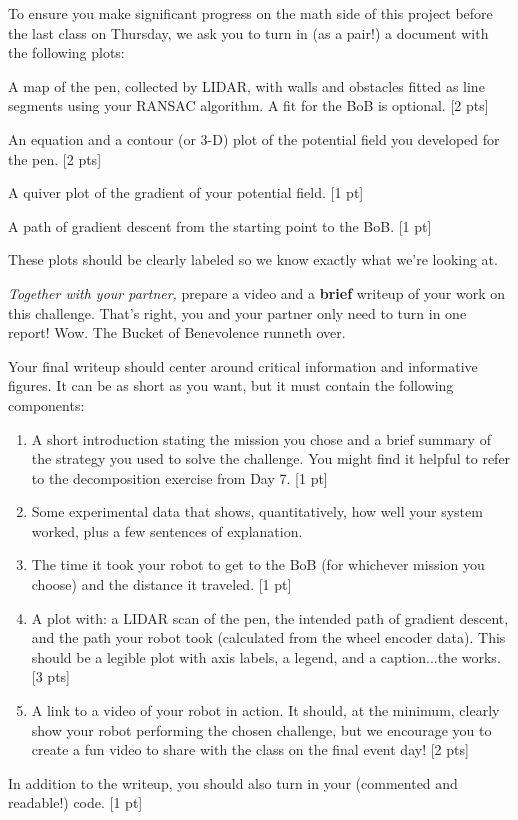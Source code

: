 \documentclass{tufte-handout}
\begin{document}
To ensure you make significant progress on the math side of this project before the last class on Thursday, we ask you to turn in (as a pair!) a document with the following plots:
\be
\item A map of the pen, collected by LIDAR, with walls and obstacles fitted as line segments using your RANSAC algorithm. A fit for the BoB is optional. [2 pts]
\item An equation and a contour (or 3-D) plot of the potential field you developed for the pen. [2 pts]
\item A quiver plot of the gradient of your potential field. [1 pt]
\item A path of gradient descent from the starting point to the BoB. [1 pt]
\ee

These plots should be clearly labeled so we know exactly what we're looking at.



\emph{Together with your partner,} prepare a video and a {\bf brief} writeup of your work on this challenge. That's right, you and your partner only need to turn in one report! Wow. The Bucket of Benevolence runneth over. 

Your final writeup should center around critical information and informative figures. It can be as short as you want, but it must contain the following components:
\begin{enumerate}
\item A short introduction stating the mission you chose and a brief summary of the strategy you used to solve the challenge. You might find it helpful to refer to the decomposition exercise from Day 7. [1 pt]
\item Some experimental data that shows, quantitatively, how well your system worked, plus a few sentences of explanation. 
\be
\item The time it took your robot to get to the BoB (for whichever mission you choose) and the distance it traveled. [1 pt]
\item A plot with: a LIDAR scan of the pen,  the intended path of gradient descent, and the path your robot took (calculated from the wheel encoder data). This should be a legible plot with axis labels, a legend, and a caption...the works. [3 pts]
\ee
\item A link to a video of your robot in action. It should, at the minimum, clearly show your robot performing the chosen challenge, but we encourage you to create a fun video to share with the class on the final event day! [2 pts]
\end{enumerate}

In addition to the writeup, you should also turn in your (commented and readable!) code. [1 pt]
\end{document}
